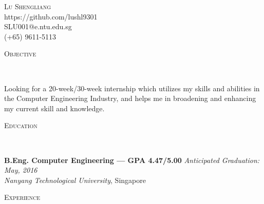 \documentclass[a4paper, 10pt]{article}
\newenvironment{changemargin}[2]{%
  \begin{list}{}{%
      \setlength{\topsep}{0pt}%
      \setlength{\leftmargin}{#1}%
      \setlength{\rightmargin}{#2}%
      \setlength{\listparindent}{\parindent}%
      \setlength{\itemindent}{\parindent}%
      \setlength{\parsep}{\parskip}%
    }%
  \item[]}{\end{list}
}
\newcommand{\lineover}{
  \begin{changemargin}{-0.05in}{-0.05in}
    \vspace*{-8pt}
    \hrulefill \\
    \vspace*{-2pt}
  \end{changemargin}
}
\newcommand{\header}[1]{
  \begin{changemargin}{-0.5in}{-0.5in}
    \scshape{#1}\\
    \lineover
  \end{changemargin}
}
\newcommand{\contact}[4]{
  \begin{changemargin}{-0.5in}{-0.5in}
    \begin{center}
      {\Large \scshape {#1}}\\ \smallskip
      {#2}\\ \smallskip 
      {#3}\\ \smallskip
      {#4}   \smallskip
    \end{center}
  \end{changemargin}
}
\newenvironment{body}
{
\vspace*{-16pt}
\begin{changemargin}{-0.25in}{-0.5in}
}	
{
\end{changemargin}
}
\begin{document}
\contact{Lu Shengliang}{https://github.com/lushl9301}{SLU001@e.ntu.edu.sg}{(+65) 9611-5113}


\header{Objective}

\begin{body}
  \vspace{14pt}
  Looking for a 20-week/30-week internship which utilizes my skills and abilities in the Computer Engineering Industry, and helps me in broadening and enhancing my current skill and knowledge.
\end{body}

\smallskip
\medskip

\header{Education}

\begin{body}
  \vspace{14pt}
  \textbf{B.Eng. Computer Engineering --- GPA 4.47/5.00} \hfill \emph{Anticipated Graduation: May, 2016} \\
  \emph{Nanyang Technological University}, Singapore\\
\end{body}

\smallskip
\medskip

\header{Experience}
\end{document}
